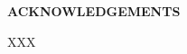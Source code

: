 \cleardoublepage
\pagestyle{plain}
\begin{center}
{\Large\textbf{ACKNOWLEDGEMENTS}}
\end{center}
\renewcommand{\baselinestretch}{1.50}\normalsize
XXX









